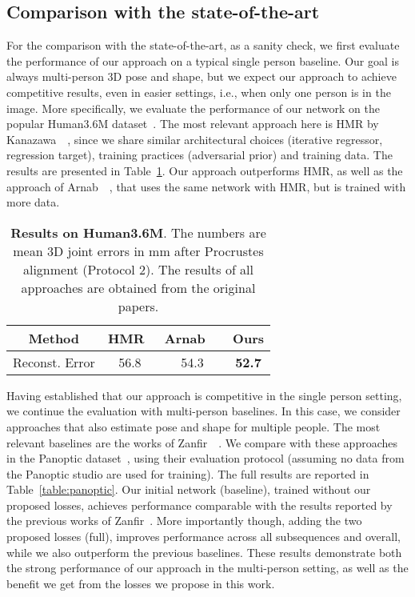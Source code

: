 \subsection{Comparison with the state-of-the-art} \label{sec:sota}
For the comparison with the state-of-the-art, as a sanity check, we first evaluate the performance of our approach on a typical single person baseline. Our goal is always multi-person 3D pose and shape, but we expect our approach to achieve competitive results, even in easier settings, i.e., when only one person is in the image. More specifically, we evaluate the performance of our network on the popular Human3.6M dataset~\cite{ionescu2013human3}. The most relevant approach here is HMR by Kanazawa~\etal~\cite{kanazawa2018end}, since we share similar architectural choices (iterative regressor, regression target), training practices (adversarial prior) and training data. The results are presented in Table~\ref{table:h36m}. Our approach outperforms HMR, as well as the approach of Arnab~\etal~\cite{arnab2019exploiting}, that uses the same network with HMR, but is trained with more data.

\begin{table}\centering
	\begin{tabular}{c|c|c|c}
		\toprule
		Method & HMR~\cite{kanazawa2018end} & Arnab~\etal~\cite{arnab2019exploiting} & Ours  \\
		\midrule
		Reconst. Error & 56.8 & 54.3 & \textbf{52.7}\\
		\bottomrule
	\end{tabular}
	\caption{\textbf{Results on Human3.6M}. The numbers are mean 3D joint errors in mm after Procrustes alignment (Protocol 2). The results of all approaches are obtained from the original papers.}
	\label{table:h36m}
\end{table}

Having established that our approach is competitive in the single person setting, we continue the evaluation with multi-person baselines. In this case, we consider approaches that also estimate pose and shape for multiple people. The most relevant baselines are the works of Zanfir~\etal~\cite{zanfir2018monocular,zanfir2018deep}. We compare with these approaches in the Panoptic dataset~\cite{joo2015panoptic,joo2017panoptic}, using their evaluation protocol (assuming no data from the Panoptic studio are used for training). The full results are reported in Table~\ref{table:panoptic}. Our initial network (baseline), trained without our proposed losses, achieves performance comparable with the results reported by the previous works of Zanfir~\etal. More importantly though, adding the two proposed losses (full), improves performance across all subsequences and overall, while we also outperform the previous baselines. These results demonstrate both the strong performance of our approach in the multi-person setting, as well as the benefit we get from the losses we propose in this work.

